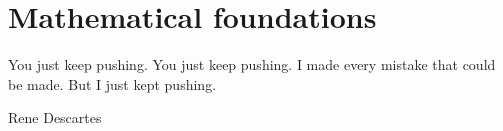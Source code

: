 \chapter{Mathematical foundations}











\epigraph{You just keep pushing. You just keep pushing. I made every mistake that could be made. But I just kept pushing.}{Rene Descartes}

